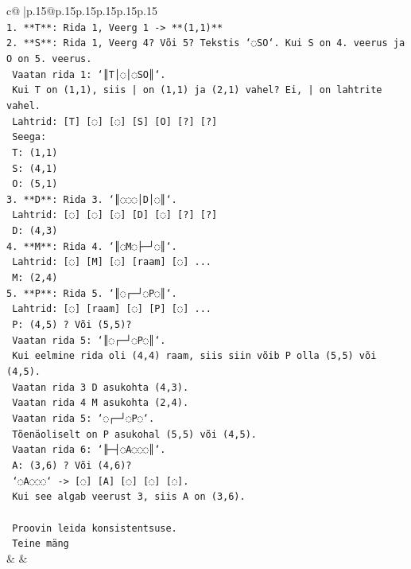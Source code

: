 \documentclass{article}
\begin{document}
{\begin{supertabular}{c@{$\;$}|p{.15\linewidth}@{}p{.15\linewidth}p{.15\linewidth}p{.15\linewidth}p{.15\linewidth}p{.15\linewidth}}
{{{\\ 
\texttt{1.  **T**: Rida 1, Veerg 1 {-}> **(1,1)**} \\
\texttt{2.  **S**: Rida 1, Veerg 4? Või 5? Tekstis `◌SO`. Kui S on 4. veerus ja O on 5. veerus.} \\
\texttt{    Vaatan rida 1: `║T│◌│◌SO║`.} \\
\texttt{    Kui T on (1,1), siis | on (1,1) ja (2,1) vahel? Ei, | on lahtrite vahel.} \\
\texttt{    Lahtrid: {[}T{]} {[}◌{]} {[}◌{]} {[}S{]} {[}O{]} {[}?{]} {[}?{]}} \\
\texttt{    Seega:} \\
\texttt{    T: (1,1)} \\
\texttt{    S: (4,1)} \\
\texttt{    O: (5,1)} \\
\texttt{3.  **D**: Rida 3. `║◌◌◌│D│◌║`.} \\
\texttt{    Lahtrid: {[}◌{]} {[}◌{]} {[}◌{]} {[}D{]} {[}◌{]} {[}?{]} {[}?{]}} \\
\texttt{    D: (4,3)} \\
\texttt{4.  **M**: Rida 4. `║◌M◌├─┘◌║`.} \\
\texttt{    Lahtrid: {[}◌{]} {[}M{]} {[}◌{]} {[}raam{]} {[}◌{]} ...} \\
\texttt{    M: (2,4)} \\
\texttt{5.  **P**: Rida 5. `║◌┌─┘◌P◌║`.} \\
\texttt{    Lahtrid: {[}◌{]} {[}raam{]} {[}◌{]} {[}P{]} {[}◌{]} ...} \\
\texttt{    P: (4,5) ? Või (5,5)?} \\
\texttt{    Vaatan rida 5: `║◌┌─┘◌P◌║`.} \\
\texttt{    Kui eelmine rida oli (4,4) raam, siis siin võib P olla (5,5) või (4,5).} \\
\texttt{    Vaatan rida 3 D asukohta (4,3).} \\
\texttt{    Vaatan rida 4 M asukohta (2,4).} \\
\texttt{    Vaatan rida 5: `◌┌─┘◌P◌`.} \\
\texttt{    Tõenäoliselt on P asukohal (5,5) või (4,5).} \\
\texttt{    Vaatan rida 6: `╟─┤◌A◌◌◌║`.} \\
\texttt{    A: (3,6) ? Või (4,6)?} \\
\texttt{    `◌A◌◌◌` {-}> {[}◌{]} {[}A{]} {[}◌{]} {[}◌{]} {[}◌{]}.} \\
\texttt{    Kui see algab veerust 3, siis A on (3,6).} \\
\\ 
\texttt{    Proovin leida konsistentsuse.} \\
\texttt{    Teine mäng} \\
            }
        }
    }
    & & \\ \\


\end{supertabular}}
\end{document}

